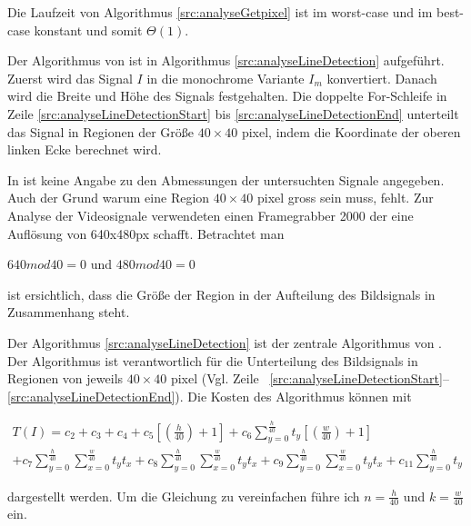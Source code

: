 

Die Laufzeit von Algorithmus \ref{src:analyseGetpixel} ist im worst-case und im best-case konstant und somit
 $\Theta(1)$.

Der Algorithmus von \citeauthor{clarke96} ist in Algorithmus \ref{src:analyseLineDetection} aufgeführt. Zuerst wird das
 Signal $I$ in die monochrome Variante $I_m$ konvertiert. Danach wird die Breite und Höhe des Signals festgehalten. Die
 doppelte For-Schleife in Zeile \ref{src:analyseLineDetectionStart} bis \ref{src:analyseLineDetectionEnd} unterteilt
 das Signal in Regionen der Größe $40 \times 40$ \gls{pixel}, indem die Koordinate der oberen linken Ecke berechnet
 wird.



In \citeauthor{clarke96} ist keine Angabe zu den Abmessungen der untersuchten Signale angegeben. Auch der Grund warum
 eine Region $40 \times 40$ \gls{pixel} gross sein muss, fehlt. Zur Analyse der Videosignale verwendeten
 \citeauthor{clarke96} einen Framegrabber 2000 der eine Auflösung von 640x480px schafft. Betrachtet man

$640 mod 40 = 0$ und $480 mod 40 = 0$

ist ersichtlich, dass die Größe der Region in der Aufteilung des Bildsignals in Zusammenhang steht.

Der Algorithmus \ref{src:analyseLineDetection} ist der zentrale Algorithmus von \citeauthor{clarke96}. Der Algorithmus
 ist verantwortlich für die Unterteilung des Bildsignals in Regionen von jeweils $40 \times 40$ \gls{pixel} (Vgl. Zeile
~\ref{src:analyseLineDetectionStart}--\ref{src:analyseLineDetectionEnd}). Die Kosten des Algorithmus können mit

\begin{equation}
\begin{split}
	T(I) = c_2
	 + c_3
	 + c_4
	 + c_5 \left[\left(\frac{h}{40}\right) + 1\right]
	 + c_6 \sum \limits_{y = 0}^{\frac{h}{40}} t_y \left[\left(\frac{w}{40}\right) + 1 \right]\\
	 + c_7 \sum \limits_{y = 0}^{\frac{h}{40}} \sum \limits_{x = 0}^{\frac{w}{40}} t_y t_x
	 + c_8 \sum \limits_{y = 0}^{\frac{h}{40}} \sum \limits_{x = 0}^{\frac{w}{40}} t_y t_x
	 + c_9 \sum \limits_{y = 0}^{\frac{h}{40}} \sum \limits_{x = 0}^{\frac{w}{40}} t_y t_x
	 + c_{11} \sum \limits_{y = 0}^{\frac{h}{40}} t_y
\end{split}
\end{equation}

dargestellt werden. Um die Gleichung zu vereinfachen führe ich $n = \tfrac{h}{40}$ und $k = \tfrac{w}{40}$ ein.

